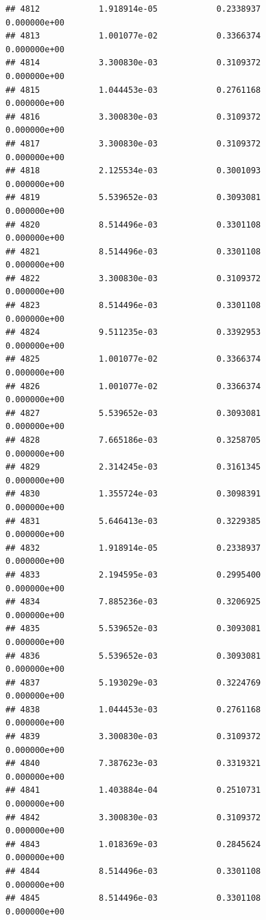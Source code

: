 \documentclass[
]{article}
\begin{document}
\begin{verbatim}
## 4812            1.918914e-05            0.2338937            0.000000e+00
## 4813            1.001077e-02            0.3366374            0.000000e+00
## 4814            3.300830e-03            0.3109372            0.000000e+00
## 4815            1.044453e-03            0.2761168            0.000000e+00
## 4816            3.300830e-03            0.3109372            0.000000e+00
## 4817            3.300830e-03            0.3109372            0.000000e+00
## 4818            2.125534e-03            0.3001093            0.000000e+00
## 4819            5.539652e-03            0.3093081            0.000000e+00
## 4820            8.514496e-03            0.3301108            0.000000e+00
## 4821            8.514496e-03            0.3301108            0.000000e+00
## 4822            3.300830e-03            0.3109372            0.000000e+00
## 4823            8.514496e-03            0.3301108            0.000000e+00
## 4824            9.511235e-03            0.3392953            0.000000e+00
## 4825            1.001077e-02            0.3366374            0.000000e+00
## 4826            1.001077e-02            0.3366374            0.000000e+00
## 4827            5.539652e-03            0.3093081            0.000000e+00
## 4828            7.665186e-03            0.3258705            0.000000e+00
## 4829            2.314245e-03            0.3161345            0.000000e+00
## 4830            1.355724e-03            0.3098391            0.000000e+00
## 4831            5.646413e-03            0.3229385            0.000000e+00
## 4832            1.918914e-05            0.2338937            0.000000e+00
## 4833            2.194595e-03            0.2995400            0.000000e+00
## 4834            7.885236e-03            0.3206925            0.000000e+00
## 4835            5.539652e-03            0.3093081            0.000000e+00
## 4836            5.539652e-03            0.3093081            0.000000e+00
## 4837            5.193029e-03            0.3224769            0.000000e+00
## 4838            1.044453e-03            0.2761168            0.000000e+00
## 4839            3.300830e-03            0.3109372            0.000000e+00
## 4840            7.387623e-03            0.3319321            0.000000e+00
## 4841            1.403884e-04            0.2510731            0.000000e+00
## 4842            3.300830e-03            0.3109372            0.000000e+00
## 4843            1.018369e-03            0.2845624            0.000000e+00
## 4844            8.514496e-03            0.3301108            0.000000e+00
## 4845            8.514496e-03            0.3301108            0.000000e+00

\end{verbatim}
\end{document}
